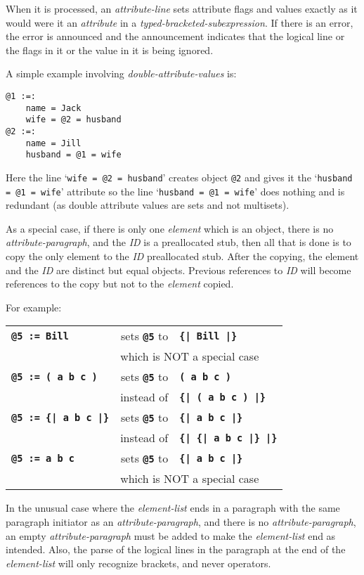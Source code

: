 \documentclass[12pt]{article}
\newcommand{\TT}[1]{{\tt \bfseries #1}}
\newenvironment{indpar}[1][0.3in]%
	{\begin{list}{}%
		     {\setlength{\itemsep}{0in}%
		      \setlength{\topsep}{0in}%
		      \setlength{\parsep}{1ex}%
		      \setlength{\labelwidth}{#1}%
		      \setlength{\leftmargin}{#1}%
		      \addtolength{\leftmargin}{\labelsep}}%
	 \item}%
	{\end{list}}
\begin{document}
\begin{indpar}
\begin{indpar}[0.5em]
When it is processed, an {\em attribute-line} sets attribute flags and
values exactly as it would were it an {\em attribute}
in a {\em typed-bracketed-subexpression}.
If there is an error, the error is
announced and the announcement indicates that the logical line
or the flags in it or the value in it is being ignored.


A simple example involving {\em double-attribute-values} is:
\begin{indpar}[0.2in]\begin{verbatim}
@1 :=:
    name = Jack
    wife = @2 = husband
@2 :=:
    name = Jill
    husband = @1 = wife
\end{verbatim}\end{indpar}
Here the line `{\tt wife = @2 = husband}' creates object {\tt @2}
and gives it the `{\tt husband = @1 = wife}' attribute so the line
`{\tt husband = @1 = wife}' does nothing and is redundant (as double
attribute values are sets and not multisets).

As a special case, if there is only one {\em element} which is an object,
there is no {\em attribute-paragraph},
and the {\em ID} is a preallocated stub,
then all that is done is to copy the only element
to the {\em ID} preallocated stub.
After the copying, the element and the {\em ID} are distinct but
equal objects.  Previous references to {\em ID} will become
references to the copy but not to the {\em element} copied.

For example:
\begin{center}
\begin{tabular}{lrl}
\TT{@5 := Bill}     & sets \TT{@5} to  & \TT{\{| Bill |\}} \\
		    & \multicolumn{2}{l}{which is NOT a special case}
\\[1ex]
\TT{@5 := ( a b c )} & sets \TT{@5} to & \TT{( a b c )} \\
                    & instead of      & \TT{\{| ( a b c ) |\}}
\\[1ex]
\TT{@5 := \{| a b c |\}} & sets \TT{@5} to & \TT{\{| a b c |\}} \\
                    & instead of      & \TT{\{| \{| a b c |\} |\}}
\\[1ex]
\TT{@5 := a b c}    & sets \TT{@5} to  & \TT{\{| a b c |\}} \\
		    & \multicolumn{2}{l}{which is NOT a special case}
\end{tabular}
\end{center}

In the unusual case where the {\em element-list} ends in a
paragraph with the same paragraph initiator as an
{\em attribute-paragraph}, and there is no {\em attribute-paragraph},
an empty {\em attribute-paragraph} must be added to make
the {\em element-list} end as intended.
Also, the parse of the logical lines in the paragraph
at the end of the {\em element-list} will only recognize brackets,
and never operators.


\end{indpar}
\end{indpar}
\end{document}
